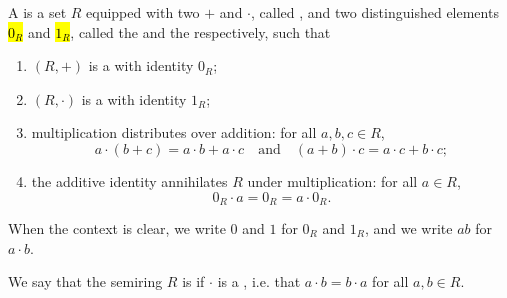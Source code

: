 \begin{definition} \label{definition:semiring}
    A  is a set $R$ equipped with two  $+$ and $\cdot$, called , and two distinguished elements \hl{$0_R$} and \hl{$1_R$}, called the  and the  respectively, such that
    \begin{enumerate}
        \item $(R, +)$ is a  with identity $0_R$;
        \item $(R, \cdot)$ is a  with identity $1_R$;
        \item multiplication distributes over addition: for all $a, b, c \in R$,
            $$a \cdot (b + c) = a \cdot b + a \cdot c \quad\text{and}\quad (a + b) \cdot c = a \cdot c + b \cdot c;$$
        \item the additive identity annihilates $R$ under multiplication: for all $a \in R$,
            $$0_R \cdot a = 0_R = a \cdot 0_R.$$
    \end{enumerate}
    When the context is clear, we write $0$ and $1$ for $0_R$ and $1_R$, and we write $ab$ for $a \cdot b$.

    We say that the semiring $R$ is  if $\cdot$ is a , i.e. that $a \cdot b = b \cdot a$ for all $a,b \in R$.
\end{definition}